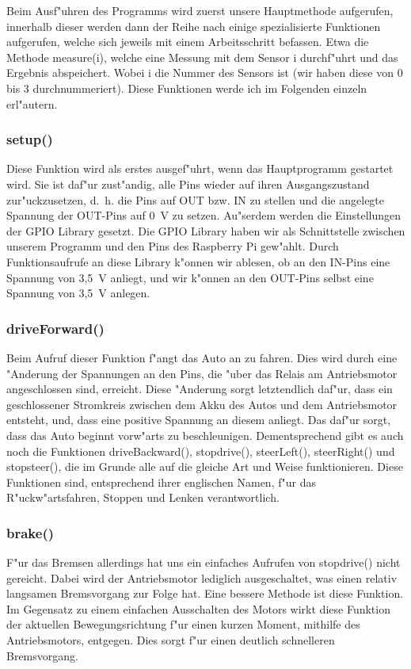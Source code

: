 \documentclass[a4paper,12pt]{article}
\begin{document}
\medskip

Beim Ausf"uhren des Programms wird zuerst unsere Hauptmethode aufgerufen, innerhalb dieser werden dann der Reihe nach einige spezialisierte Funktionen aufgerufen, welche sich jeweils mit einem Arbeitsschritt befassen.
Etwa die Methode measure(i), welche eine Messung mit dem Sensor i durchf"uhrt und das Ergebnis abspeichert.
Wobei i die Nummer des Sensors ist (wir haben diese von 0 bis 3 durchnummeriert).
Diese Funktionen werde ich im Folgenden einzeln erl"autern.

\subsubsection{setup()}\label{sec2.2.1}

Diese Funktion wird als erstes ausgef"uhrt, wenn das Hauptprogramm gestartet wird.
Sie ist daf"ur zust"andig, alle Pins wieder auf ihren Ausgangszustand zur"uckzusetzen, d.~h. die Pins auf OUT bzw. IN zu stellen und die angelegte Spannung der OUT-Pins auf 0~V zu setzen.
Au"serdem werden die Einstellungen der GPIO Library gesetzt.
Die GPIO Library haben wir als Schnittstelle zwischen unserem Programm und den Pins des Raspberry Pi gew"ahlt.
Durch Funktionsaufrufe an diese Library k"onnen wir ablesen, ob an den IN-Pins eine Spannung von 3,5~V anliegt, und wir k"onnen an den OUT-Pins selbst eine Spannung von 3,5~V anlegen.

\subsubsection{driveForward()}\label{sec2.2.2}

Beim Aufruf dieser Funktion f"angt das Auto an zu fahren.
Dies wird durch eine "Anderung der Spannungen an den Pins, die "uber das Relais am Antriebsmotor angeschlossen sind, erreicht.
Diese "Anderung sorgt letztendlich daf"ur, dass ein geschlossener Stromkreis zwischen dem Akku des Autos und dem Antriebsmotor entsteht, und, dass eine positive Spannung an diesem anliegt.
Das daf"ur sorgt, dass das Auto beginnt vorw"arts zu beschleunigen.
Dementsprechend gibt es auch noch die Funktionen driveBackward(), stopdrive(), steerLeft(), steerRight() und stopsteer(), die im Grunde alle auf die gleiche Art und Weise funktionieren.
Diese Funktionen sind, entsprechend ihrer englischen Namen, f"ur das R"uckw"artsfahren, Stoppen und Lenken verantwortlich.

\subsubsection{brake()}\label{sec2.2.3}

F"ur das Bremsen allerdings hat uns ein einfaches Aufrufen von stopdrive() nicht gereicht.
Dabei wird der Antriebsmotor lediglich ausgeschaltet, was einen relativ langsamen Bremsvorgang zur Folge hat.
Eine bessere Methode ist diese Funktion.
Im Gegensatz zu einem einfachen Ausschalten des Motors wirkt diese Funktion der aktuellen Bewegungsrichtung f"ur einen kurzen Moment, mithilfe des Antriebsmotors, entgegen.
Dies sorgt f"ur einen deutlich schnelleren Bremsvorgang.
\end{document}
